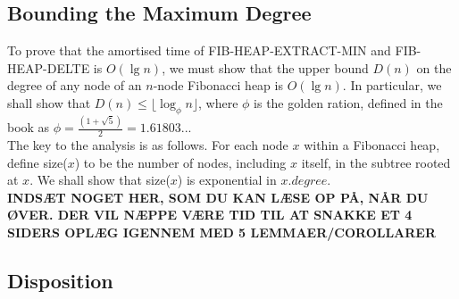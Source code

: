 \subsection{Bounding the Maximum Degree}
To prove that the amortised time of FIB-HEAP-EXTRACT-MIN and FIB-HEAP-DELTE is $O(\lg n)$, we must show that the upper bound $D(n)$ on the degree of any node of an $n$-node Fibonacci heap is $O(\lg n)$. In particular, we shall show that $D(n) \leq \lfloor \log_{\phi}n\rfloor$, where $\phi$ is the golden ration, defined in the book as $\phi = \frac{(1 + \sqrt{5})}{2} = 1.61803...$\\

The key to the analysis is as follows. For each node $x$ within a Fibonacci heap, define size($x$) to be the number of nodes, including $x$ itself, in the subtree rooted at $x$. We shall show that size($x$) is exponential in $x.degree$. \\

\textbf{INDSÆT NOGET HER, SOM DU KAN LÆSE OP PÅ, NÅR DU ØVER. DER VIL NÆPPE VÆRE TID TIL AT SNAKKE ET 4 SIDERS OPLÆG IGENNEM MED 5 LEMMAER/COROLLARER}
%
\subsection{Disposition}